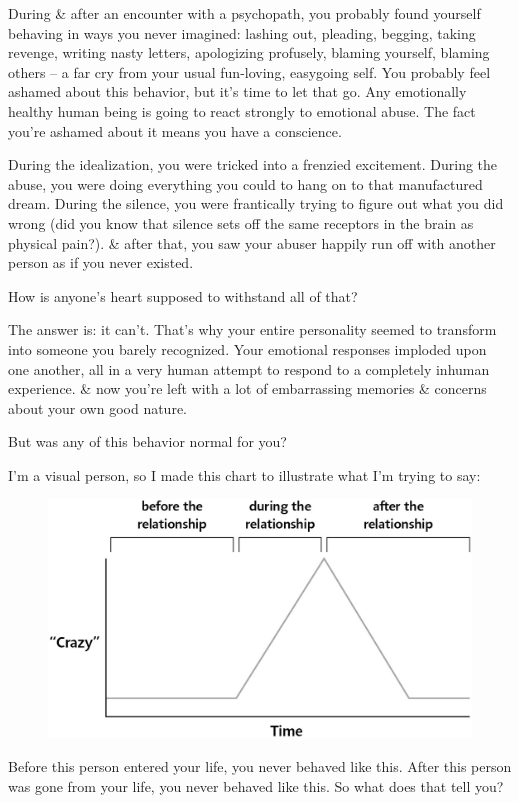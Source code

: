\documentclass{article}
\numberwithin{equation}{section}
\begin{document}
During \& after an encounter with a psychopath, you probably found yourself behaving in ways you never imagined: lashing out, pleading, begging, taking revenge, writing nasty letters, apologizing profusely, blaming yourself, blaming others -- a far cry from your usual fun-loving, easygoing self. You probably feel ashamed about this behavior, but it's time to let that go. Any emotionally healthy human being is going to react strongly to emotional abuse. The fact you're ashamed about it means you have a conscience.

During the idealization, you were tricked into a frenzied excitement. During the abuse, you were doing everything you could to hang on to that manufactured dream. During the silence, you were frantically trying to figure out what you did wrong (did you know that silence sets off the same receptors in the brain as physical pain?). \& after that, you saw your abuser happily run off with another person as if you never existed.

How is anyone's heart supposed to withstand all of that?

The answer is: it can't. That's why your entire personality seemed to transform into someone you barely recognized. Your emotional responses imploded upon one another, all in a very human attempt to respond to a completely inhuman experience. \& now you're left with a lot of embarrassing memories \& concerns about your own good nature.

But was any of this behavior normal for you?

I'm a visual person, so I made this chart to illustrate what I'm trying to say:
\begin{figure}[H]
	\centering
	\includegraphics[scale=.2]{time_crazy_chart}
\end{figure}
Before this person entered your life, you never behaved like this. After this person was gone from your life, you never behaved like this. So what does that tell you?
\end{document}
